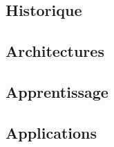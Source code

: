 \subsection{Historique}


\subsection{Architectures}


\subsection{Apprentissage}


\subsection{Applications}

